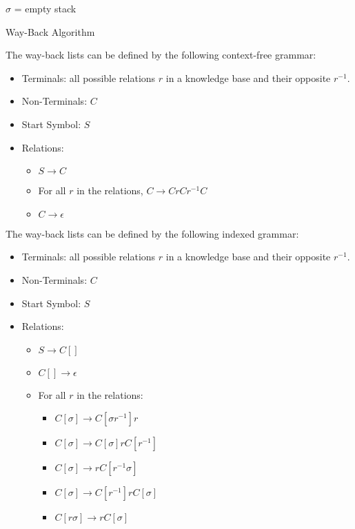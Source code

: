 \documentclass[10pt,a4paper,draft]{article}
\begin{document}
\begin{algorithm}[H]
 \SetAlgoLined
 $\sigma$ = empty stack\;
 \caption{Way-Back Algorithm}
\end{algorithm}


\begin{definition}
\label{Way-Back List 2}
The way-back lists can be defined by the following context-free grammar:

\begin{itemize}[noitemsep]
\item Terminals: all possible relations $r$ in a knowledge base and their opposite $r^{-1}$.
\item Non-Terminals: $C$
\item Start Symbol: $S$
\item Relations:
\begin{itemize}[noitemsep]
\item $S \rightarrow C$
\item For all $r$ in the relations, $C \rightarrow CrCr^{-1}C$
\item  $C \rightarrow \epsilon$
\end{itemize}
\end{itemize}

\end{definition}


\begin{definition}
\label{Way-Back List 3}
The way-back lists can be defined by the following indexed grammar:
\begin{itemize}[noitemsep]
\item Terminals: all possible relations $r$ in a knowledge base and their opposite $r^{-1}$.
\item Non-Terminals: $C$
\item Start Symbol: $S$
\item Relations:
\begin{itemize}
\item $S \rightarrow C[]$
\item  $C[] \rightarrow \epsilon$
\item For all $r$ in the relations:
\begin{itemize}
\item $C[\sigma] \rightarrow C[\sigma r^{-1}] r$
\item $C[\sigma] \rightarrow C[\sigma] r C[r^{-1}]$
\item $C[\sigma] \rightarrow r C[r^{-1} \sigma]$
\item $C[\sigma] \rightarrow C[r^{-1}] r C[\sigma]$
\item $C[r \sigma] \rightarrow r C[\sigma]$
\end{itemize}
\end{itemize}
\end{itemize}
\end{definition}
\end{document}
